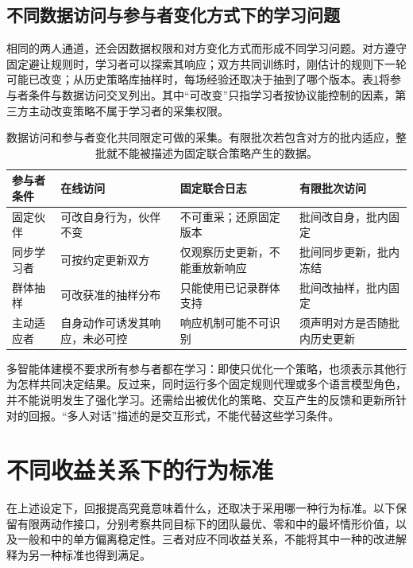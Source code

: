 \subsection{不同数据访问与参与者变化方式下的学习问题}
\label{sec:rl-multi-agent-access}

相同的两人通道，还会因数据权限和对方变化方式而形成不同学习问题。对方遵守固定避让规则时，学习者可以探索其响应；双方共同训练时，刚估计的规则下一轮可能已改变；从历史策略库抽样时，每场经验还取决于抽到了哪个版本。表\ref{tab:rl-multi-agent-access}将参与者条件与数据访问交叉列出。其中“可改变”只指学习者按协议能控制的因素，第三方主动改变策略不属于学习者的采集权限。

\begin{table}[htbp]
 \centering
 \begin{tabularx}{\linewidth}{@{}l >{\raggedright\arraybackslash}X >{\raggedright\arraybackslash}X >{\raggedright\arraybackslash}X@{}}
 \toprule
 参与者条件 & 在线访问 & 固定联合日志 & 有限批次访问\\
 \midrule
 固定伙伴 & 可改自身行为，伙伴不变 & 不可重采；还原固定版本 & 批间改自身，批内固定\\
 同步学习者 & 可按约定更新双方 & 仅观察历史更新，不能重放新响应 & 批间同步更新，批内冻结\\
 群体抽样 & 可改获准的抽样分布 & 只能使用已记录群体支持 & 批间改抽样，批内固定\\
 主动适应者 & 自身动作可诱发其响应，未必可控 & 响应机制可能不可识别 & 须声明对方是否随批内历史更新\\
 \bottomrule
 \end{tabularx}
 \caption{数据访问和参与者变化共同限定可做的采集。有限批次若包含对方的批内适应，整批就不能被描述为固定联合策略产生的数据。}
 \label{tab:rl-multi-agent-access}
\end{table}

多智能体建模不要求所有参与者都在学习：即使只优化一个策略，也须表示其他行为怎样共同决定结果。反过来，同时运行多个固定规则代理或多个语言模型角色，并不能说明发生了强化学习。还需给出被优化的策略、交互产生的反馈和更新所针对的回报。“多人对话”描述的是交互形式，不能代替这些学习条件。

\section{不同收益关系下的行为标准}
\label{sec:rl-multi-agent-solutions}

在上述设定下，回报提高究竟意味着什么，还取决于采用哪一种行为标准。以下保留有限两动作接口，分别考察共同目标下的团队最优、零和中的最坏情形价值，以及一般和中的单方偏离稳定性。三者对应不同收益关系，不能将其中一种的改进解释为另一种标准也得到满足。

